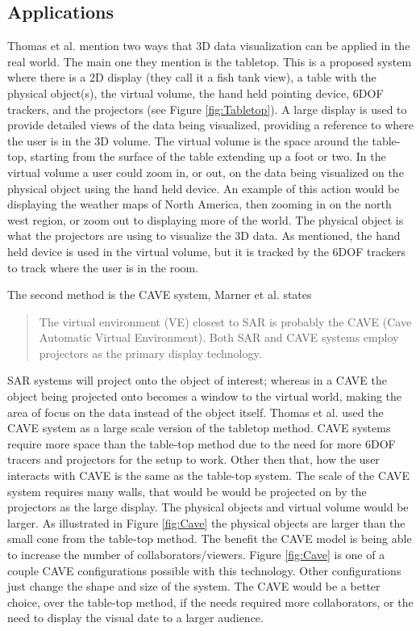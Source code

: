 \documentclass{sig-alternate}
\begin{document}
\subsection{Applications}
\label{sec:3D Applications}
Thomas et al. \cite{3D} mention two ways that 3D data visualization can be applied in the real world. The main one they mention is the tabletop. This is a proposed system where there is a 2D display (they call it a fish tank view), a table with the physical object(s), the virtual volume, the hand held pointing device, 6DOF trackers, and the projectors (see Figure \ref{fig:Tabletop}). A large display is used to provide detailed views of the data being visualized, providing a reference to where the user is in the 3D volume. The virtual volume is the space around the table-top, starting from the surface of the table extending up a foot or two. In the virtual volume a user could zoom in, or out, on the data being visualized on the physical object using the hand held device. An example of this action would be displaying the weather maps of North America, then zooming in on the north west region, or zoom out to displaying more of the world. The physical object is what the projectors are using to visualize the 3D data. As mentioned, the hand held device is used in the virtual volume, but it is tracked by the 6DOF trackers to track where the user is in the room.

The second method is the CAVE system, Marner et al. \cite{CAVE} states
\begin{quote}
	The virtual environment (VE) closest to SAR is probably the CAVE (Cave Automatic Virtual Environment). Both SAR and CAVE systems employ projectors as the primary display technology. \cite{CAVE}
\end{quote}
SAR systems will project onto the object of interest; whereas in a CAVE the object being projected onto becomes a window to the virtual world, making the area of focus on the data instead of the object itself. Thomas et al. \cite{3D} used the CAVE system as a large scale version of the tabletop method. CAVE systems require more space than the table-top method due to the need for more 6DOF tracers and projectors for the setup to work. Other then that, how the user interacts with CAVE is the same as the table-top system. The scale of the CAVE system requires many walls, that would be would be projected on by the projectors as the large display. The physical objects and virtual volume would be larger. As illustrated in Figure \ref{fig:Cave} the physical objects are larger than the small cone from the table-top method. The benefit the CAVE model is being able to increase the number of collaborators/viewers. Figure \ref{fig:Cave} is one of a couple CAVE configurations possible with this technology. Other configurations just change the shape and size of the system. The CAVE would be a better choice, over the table-top method, if the needs required more collaborators, or the need to display the visual date to a larger audience. 
\end{document}
